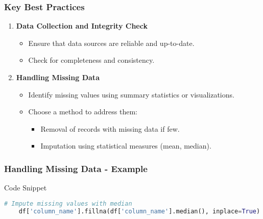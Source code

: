 \documentclass[aspectratio=169]{beamer}
\begin{document}
\begin{frame}[fragile]
    \frametitle{Key Best Practices}
    \begin{enumerate}
        \item \textbf{Data Collection and Integrity Check}
        \begin{itemize}
            \item Ensure that data sources are reliable and up-to-date.
            \item Check for completeness and consistency.
        \end{itemize}

        \item \textbf{Handling Missing Data}
        \begin{itemize}
            \item Identify missing values using summary statistics or visualizations.
            \item Choose a method to address them:
            \begin{itemize}
                \item Removal of records with missing data if few.
                \item Imputation using statistical measures (mean, median).
            \end{itemize}
        \end{itemize}
    \end{enumerate}
\end{frame}

\begin{frame}[fragile]
    \frametitle{Handling Missing Data - Example}
    \begin{block}{Code Snippet}
    \begin{lstlisting}[language=Python]
    # Impute missing values with median
    df['column_name'].fillna(df['column_name'].median(), inplace=True)
    \end{lstlisting}
    \end{block}
\end{frame}
\end{document}
